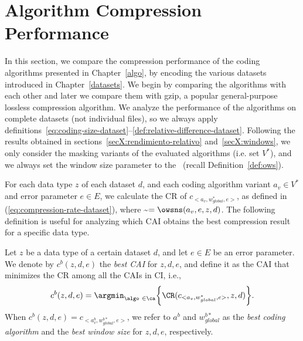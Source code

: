 
\section{Algorithm Compression Performance}
\label{secX:codersmask}


In this section, we compare the compression performance of the coding algorithms presented in Chapter~\ref{algo}, by encoding the various datasets introduced in Chapter~\ref{datasets}. We begin by comparing the algorithms with each other and later we compare them with gzip, a popular general-purpose lossless compression algorithm. We analyze the performance of the algorithms on complete datasets (not individual files), so we always apply definitions~\ref{eq:coding-size-dataset}--\ref{def:relative-difference-dataset}. Following the results obtained in sections~\ref{secX:rendimiento-relativo} and~\ref{secX:windows}, we only consider the masking variants of the evaluated algorithms (i.e. set $V^{*}$), and we always set the window size parameter to the \owsns\ (recall Definition~\ref{def:ows}).


For each data type $z$ of each dataset $d$, and each coding algorithm variant $a_v \in V^{*}$ and error parameter $e \in E$, we calculate the CR of $c_{<a_v, w_{global}^{*}, e>}$, as defined in (\ref{eq:compression-rate-dataset}), where \WGlobal\~$=\owsns(a_v, e, z, d)$. The following definition is useful for analyzing which CAI obtains the best compression result for a specific data type.


\newcommand{\tasaCompTwo}{\CR(c_{<a_v, w_{global}^{*}, e>}, z, d)}
\begin{defcion}
\label{def:bestcai}
Let $z$ be a data type of a certain dataset $d$, and let $e \in E$ be an error parameter. We denote by $c^{b}(z, d, e)$ the \textit{best CAI} for $z, d, e$, and define it as the CAI that minimizes the CR among all the CAIs in CI, i.e.,
\vspace{-3pt}
\begin{equation}
\label{eq:eqbestcai}
c^{b}(z, d, e) = \argmin_{\algo \ \in \ca} \biggl\{ \tasaCompTwo \biggr\}.
\end{equation}
When $c^{b}(z, d, e) = c_{<a^{b}_v, w_{global}^{b*}, e>}$, we refer to $a^{b}$ and $w_{global}^{b*}$ as the \textit{best coding algorithm} and the \textit{best window size} for $z, d, e$, respectively.
\end{defcion}


